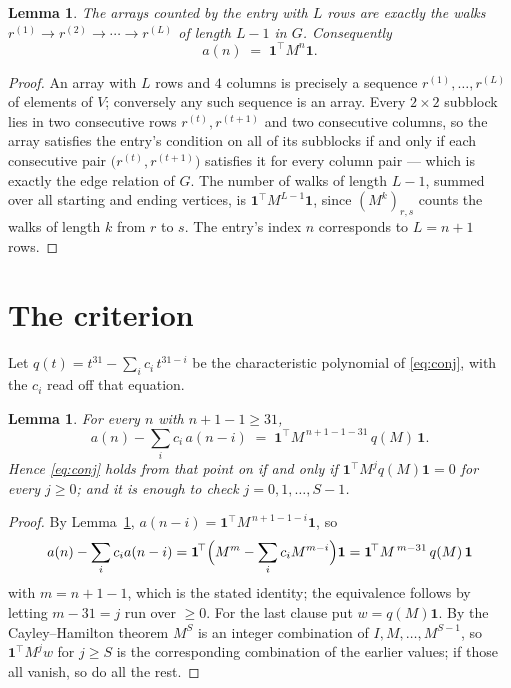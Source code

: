 \documentclass[11pt,a4paper]{article}
\theoremstyle{plain}
\newtheorem{lemma}[theorem]{Lemma}
\theoremstyle{definition}
\begin{document}
\begin{lemma}\label{lem:walk}
The arrays counted by the entry with $L$ rows are exactly the walks
$r^{(1)}\to r^{(2)}\to\cdots\to r^{(L)}$ of length $L-1$ in $G$. Consequently
\[
a(n)\;=\;\mathbf{1}^{\!\top}M^{n}\mathbf{1} .
\]
\end{lemma}

\begin{proof}
An array with $L$ rows and $4$ columns is precisely a sequence
$r^{(1)},\dots,r^{(L)}$ of elements of $V$; conversely any such sequence is an array.
Every $2\times2$ subblock lies in two consecutive rows $r^{(t)},r^{(t+1)}$ and two
consecutive columns, so the array satisfies the entry's condition on all of its subblocks
if and only if each consecutive pair $\bigl(r^{(t)},r^{(t+1)}\bigr)$ satisfies it for
every column pair --- which is exactly the edge relation of $G$. The number of walks of
length $L-1$, summed over all starting and ending vertices, is
$\mathbf{1}^{\!\top}M^{L-1}\mathbf{1}$, since $(M^{k})_{r,s}$ counts the walks of
length $k$ from $r$ to $s$. The entry's index $n$ corresponds to $L=n+1$ rows.
\end{proof}

\section{The criterion}

Let $q(t)=t^{31}-\sum_i c_i\,t^{31-i}$ be the characteristic polynomial of
\eqref{eq:conj}, with the $c_i$ read off that equation.

\begin{lemma}\label{lem:crit}
For every $n$ with $n+1-1\ge31$,
\[
a(n)-\sum_i c_i\,a(n-i)\;=\;\mathbf{1}^{\!\top}M^{\,n+1-1-31}\,q(M)\,\mathbf{1} .
\]
Hence \eqref{eq:conj} holds from that point on if and only if
$\mathbf{1}^{\!\top}M^{j}q(M)\mathbf{1}=0$ for every $j\ge0$; and it is enough to check
$j=0,1,\dots,S-1$.
\end{lemma}

\begin{proof}
By Lemma~\ref{lem:walk}, $a(n-i)=\mathbf{1}^{\!\top}M^{\,n+1-1-i}\mathbf{1}$, so
\[
a(n)-\sum_i c_i a(n-i)
=\mathbf{1}^{\!\top}\Bigl(M^{m}-\sum_i c_i M^{m-i}\Bigr)\mathbf{1}
=\mathbf{1}^{\!\top}M^{\,m-31}\,q(M)\,\mathbf{1}
\]
with $m=n+1-1$, which is the stated identity; the equivalence follows by letting
$m-31=j$ run over $\ge0$. For the last clause put $w=q(M)\mathbf{1}$. By the
Cayley--Hamilton theorem $M^{S}$ is an integer combination of $I,M,\dots,M^{S-1}$, so
$\mathbf{1}^{\!\top}M^{j}w$ for $j\ge S$ is the corresponding combination of the earlier
values; if those all vanish, so do all the rest.
\end{proof}
\end{document}
